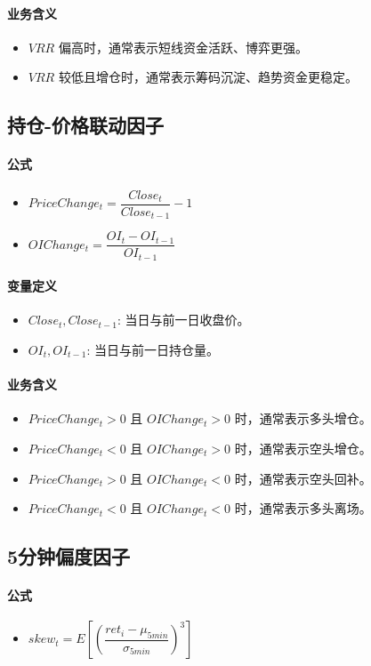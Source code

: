 \documentclass[11pt,a4paper]{ctexart}
\begin{document}
\paragraph{业务含义}
\begin{itemize}
\item $VRR$ 偏高时，通常表示短线资金活跃、博弈更强。
\item $VRR$ 较低且增仓时，通常表示筹码沉淀、趋势资金更稳定。
\end{itemize}
\subsection{持仓-价格联动因子}
\paragraph{公式}
\begin{itemize}
\item $PriceChange_t=\dfrac{Close_t}{Close_{t-1}}-1$
\item $OIChange_t=\dfrac{OI_t-OI_{t-1}}{OI_{t-1}}$
\end{itemize}
\paragraph{变量定义}
\begin{itemize}
\item $Close_t, Close_{t-1}$: 当日与前一日收盘价。
\item $OI_t, OI_{t-1}$: 当日与前一日持仓量。
\end{itemize}
\paragraph{业务含义}
\begin{itemize}
\item $PriceChange_t>0$ 且 $OIChange_t>0$ 时，通常表示多头增仓。
\item $PriceChange_t<0$ 且 $OIChange_t>0$ 时，通常表示空头增仓。
\item $PriceChange_t>0$ 且 $OIChange_t<0$ 时，通常表示空头回补。
\item $PriceChange_t<0$ 且 $OIChange_t<0$ 时，通常表示多头离场。
\end{itemize}
\subsection{5分钟偏度因子}
\paragraph{公式}
\begin{itemize}
\item $skew_t=E\left[\left(\dfrac{ret_i-\mu_{5min}}{\sigma_{5min}}\right)^3\right]$
\end{itemize}
\end{document}
